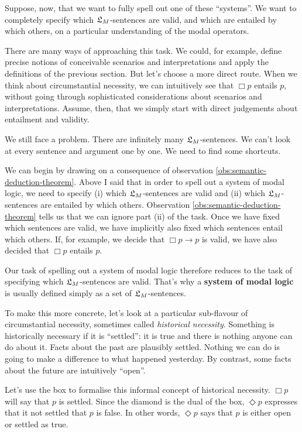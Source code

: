 Suppose, now, that we want to fully spell out one of these ``systems''. We want
to completely specify which $\mathfrak{L}_{M}$-sentences are valid, and which are entailed
by which others, on a particular understanding of the modal operators.

There are many ways of approaching this task. We could, for example, define
precise notions of conceivable scenarios and interpretations and apply the
definitions of the previous section. But let's choose a more direct route. When
we think about circumstantial necessity, we can intuitively see that $\Box p$
entails $p$, without going through sophisticated considerations about scenarios
and interpretations. Assume, then, that we simply start with direct judgements
about entailment and validity.

We still face a problem. There are infinitely many $\mathfrak{L}_{M}$-sentences. We can't
look at every sentence and argument one by one. We need to find some
shortcuts.

We can begin by drawing on a consequence of observation
\ref{obs:semantic-deduction-theorem}. Above I said that in order to spell out a
system of modal logic, we need to specify (i) which $\mathfrak{L}_{M}$-sentences are valid
and (ii) which $\mathfrak{L}_{M}$-sentences are entailed by which others. Observation
\ref{obs:semantic-deduction-theorem} tells us that we can ignore part (ii) of
the task. Once we have fixed which sentences are valid, we have implicitly
also fixed which sentences entail which others. If, for example, we decide
that $\Box p \to p$ is valid, we have also decided that $\Box p$ entails $p$.

Our task of spelling out a system of modal logic therefore reduces to
the task of specifying which $\mathfrak{L}_{M}$-sentences are valid. That's why a
\textbf{system of modal logic} is usually defined simply as a set of
$\mathfrak{L}_{M}$-sentences.

To make this more concrete, let's look at a particular sub-flavour of
circumstantial necessity, sometimes called \emph{historical necessity}.
Something is historically necessary if it is ``settled'': it is true and there
is nothing anyone can do about it. Facts about the past are plausibly settled.
Nothing we can do is going to make a difference to what happened yesterday. By
contrast, some facts about the future are intuitively ``open''.

Let's use the box to formalise this informal concept of historical
necessity. $\Box p$ will say that $p$ is settled. Since the diamond is the dual
of the box, $\Diamond p$ expresses that it not settled that $p$ is false. In
other words, $\Diamond p$ says that $p$ is either open or settled as true.

